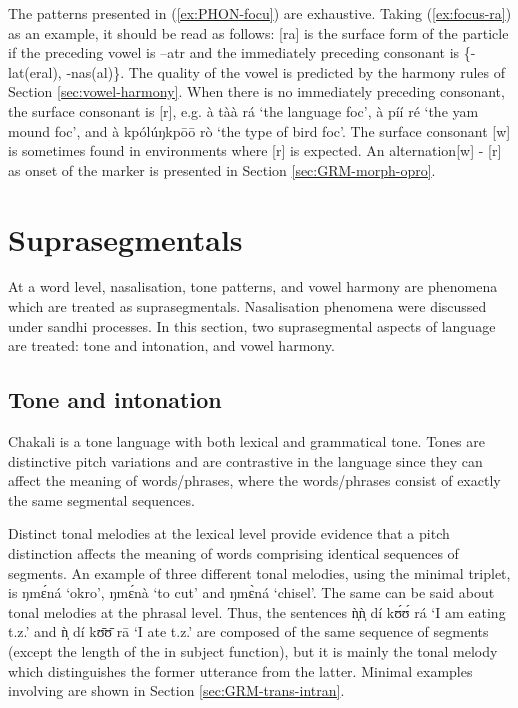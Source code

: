 The patterns presented in (\ref{ex:PHON-focu}) are exhaustive. Taking (\ref{ex:focus-ra}) as an example, it should be read as follows: [ra] is the surface form of the  particle if the preceding vowel is   {\sc --atr} and the immediately preceding consonant is \{{\sc -lat(eral), -nas(al)}\}. The quality of the vowel is predicted by the  harmony rules of Section \ref{sec:vowel-harmony}.  When there is no immediately preceding consonant,  the surface consonant is [r], e.g. {\sls à tàà rá} `the language {\sc foc}', {\sls  à píí ré} `the yam mound {\sc foc}', and {\sls à kpólúŋkpōō rò} `the type of bird {\sc foc}'.   The surface consonant  [{w}] is sometimes found in  environments where  [{r}] is expected. An alternation[{w}] - [{r}] as onset of the  marker is presented in Section \ref{sec:GRM-morph-opro}.


\section{Suprasegmentals}
\label{sec:suprasegmentals}


At a word level,  nasalisation, tone patterns, and vowel harmony are phenomena which are treated as suprasegmentals. Nasalisation phenomena were discussed under sandhi processes.  In this section,  two suprasegmental aspects of language are treated: tone and intonation, and vowel harmony.



\subsection{Tone and intonation}
\label{sec:tone-intonation}


Chakali is a tone language with both lexical and grammatical tone. Tones are distinctive pitch variations and are contrastive in the language since they can affect the meaning of  words/phrases, where the words/phrases consist of exactly the same segmental sequences.

Distinct tonal melodies at the lexical level provide evidence that a pitch distinction affects the meaning of words comprising identical sequences of segments.  An example of three different tonal melodies, using the minimal triplet, is   {\sls ŋmɛ́ná} `okro', {\sls ŋmɛ́nà} `to cut' and {\sls ŋmɛ̀ná}   `chisel'. The same can be said about tonal melodies at the phrasal level. Thus, the sentences {\sls ǹ̩ǹ̩ dí kʊ́ʊ́ rá} `I am eating t.z.' and {\sls ǹ̩ dí kʊ̄ʊ̄ rā} `I ate t.z.' are composed of the same sequence of segments (except the length of the  in subject function), but it is mainly  the tonal melody which distinguishes the former utterance from the latter.   Minimal examples involving  are shown  in Section \ref{sec:GRM-trans-intran}.


